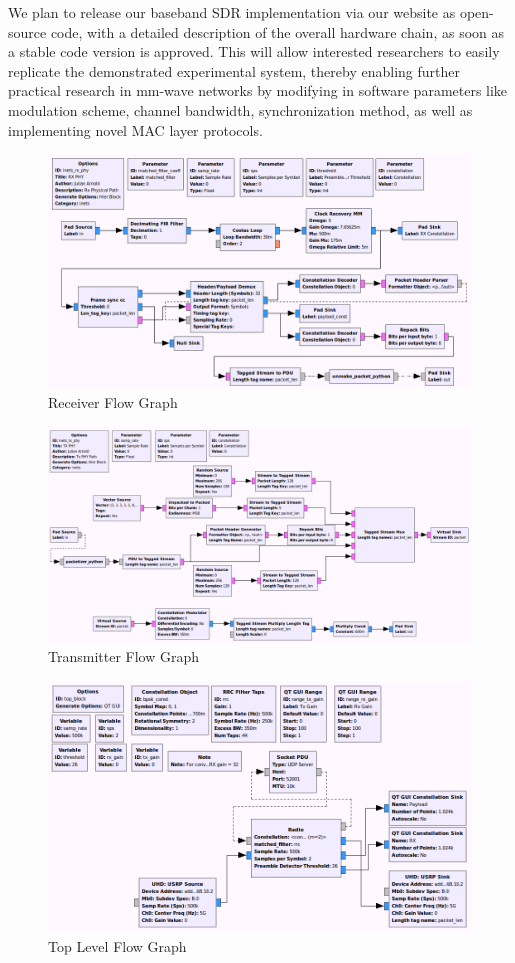 \documentclass{sig-alternate}
\begin{document}
We plan to release our baseband SDR implementation via our website \cite{gr-inets} as open-source code, with a detailed description of the overall hardware chain, as soon as a stable code version is approved. This will allow interested researchers to easily replicate the demonstrated experimental system, thereby enabling further practical research in mm-wave networks by modifying in software parameters like modulation scheme, channel bandwidth, synchronization method, as well as implementing novel MAC layer protocols.

\begin{figure}[!tb]
\center
\includegraphics[scale=0.33]{rx_path.png}
\caption{Receiver Flow Graph}
\label{fig:rx-path}
\end{figure}
\begin{figure}[!tb]
\center
\includegraphics[scale=0.33]{tx_path.png}
\caption{Transmitter Flow Graph}
\label{fig:tx-path}
\end{figure}
\begin{figure}[!tb]
\center
\includegraphics[scale=0.3]{transceiver.png}
\caption{Top Level Flow Graph}
\label{fig:top-block}
\end{figure}
\end{document}
